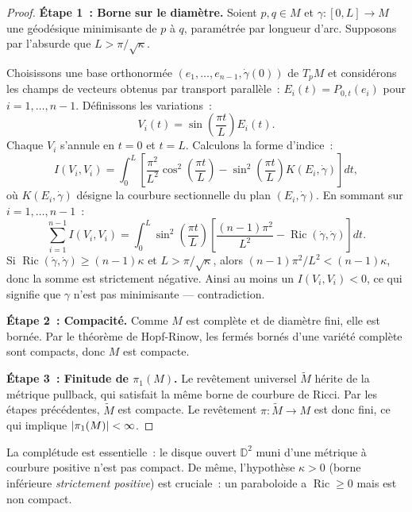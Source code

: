 \begin{proof}
\textbf{\'Etape 1~: Borne sur le diam\`etre.}
Soient $p, q \in M$ et $\gamma : [0, L] \to M$ une g\'eod\'esique minimisante
de $p$ \`a $q$, param\'etr\'ee par longueur d'arc. Supposons par l'absurde que
$L > \pi / \sqrt{\kappa}$.

Choisissons une base orthonorm\'ee $(e_1, \ldots, e_{n-1}, \dot{\gamma}(0))$ de
$T_pM$ et consid\'erons les champs de vecteurs obtenus par transport parall\`ele~:
$E_i(t) = P_{0,t}(e_i)$ pour $i = 1, \ldots, n-1$. D\'efinissons les variations~:
\[
    V_i(t) = \sin\!\left(\frac{\pi t}{L}\right) E_i(t).
\]
Chaque $V_i$ s'annule en $t = 0$ et $t = L$. Calculons la forme d'indice~:
\[
    I(V_i, V_i) = \int_0^L \left[ \frac{\pi^2}{L^2} \cos^2\!\left(\frac{\pi t}{L}\right)
    - \sin^2\!\left(\frac{\pi t}{L}\right) K(E_i, \dot{\gamma}) \right] dt,
\]
o\`u $K(E_i, \dot{\gamma})$ d\'esigne la courbure sectionnelle du plan $(E_i, \dot{\gamma})$.
En sommant sur $i = 1, \ldots, n-1$~:
\[
    \sum_{i=1}^{n-1} I(V_i, V_i) = \int_0^L \sin^2\!\left(\frac{\pi t}{L}\right)
    \left[ \frac{(n-1)\pi^2}{L^2} - \operatorname{Ric}(\dot{\gamma}, \dot{\gamma}) \right] dt.
\]
Si $\operatorname{Ric}(\dot{\gamma}, \dot{\gamma}) \geq (n-1)\kappa$ et
$L > \pi/\sqrt{\kappa}$, alors $(n-1)\pi^2/L^2 < (n-1)\kappa$, donc la somme
est strictement n\'egative. Ainsi au moins un $I(V_i, V_i) < 0$, ce qui signifie
que $\gamma$ n'est pas minimisante --- contradiction.

\textbf{\'Etape 2~: Compacit\'e.}
Comme $M$ est compl\`ete et de diam\`etre fini, elle est born\'ee. Par le
th\'eor\`eme de Hopf-Rinow, les ferm\'es born\'es d'une vari\'et\'e compl\`ete sont
compacts, donc $M$ est compacte.

\textbf{\'Etape 3~: Finitude de $\pi_1(M)$.}
Le rev\^etement universel $\widetilde{M}$ h\'erite de la m\'etrique pullback, qui
satisfait la m\^eme borne de courbure de Ricci. Par les \'etapes pr\'ec\'edentes,
$\widetilde{M}$ est compacte. Le rev\^etement $\pi : \widetilde{M} \to M$ est
donc fini, ce qui implique $\left| \pi_1(M) \right| < \infty$.
\end{proof}

\begin{attention}[title=\textbf{Hypoth\`ese de compl\'etude}]
La compl\'etude est essentielle~: le disque ouvert $\mathbb{D}^2$ muni d'une m\'etrique
\`a courbure positive n'est pas compact. De m\^eme, l'hypoth\`ese $\kappa > 0$
(borne inf\'erieure \emph{strictement positive}) est cruciale~: un paraboloide
a $\operatorname{Ric} \geq 0$ mais est non compact.
\end{attention}

